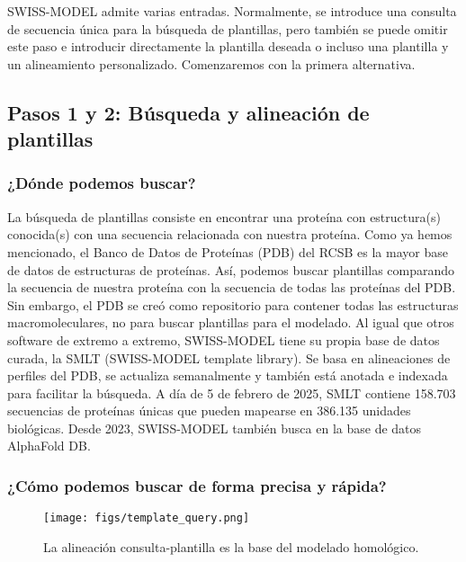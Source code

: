 SWISS-MODEL admite varias entradas. Normalmente, se introduce una consulta de secuencia única para la búsqueda de plantillas, pero también se puede omitir este paso e introducir directamente la plantilla deseada o incluso una plantilla y un alineamiento personalizado. Comenzaremos con la primera alternativa.

\subsection{Pasos 1 y 2: Búsqueda y alineación de plantillas}
\subsubsection{¿Dónde podemos buscar?}
La búsqueda de plantillas consiste en encontrar una proteína con estructura(s) conocida(s) con una secuencia relacionada con nuestra proteína. Como ya hemos mencionado, el Banco de Datos de Proteínas (PDB) del RCSB es la mayor base de datos de estructuras de proteínas. Así, podemos buscar plantillas comparando la secuencia de nuestra proteína con la secuencia de todas las proteínas del PDB. Sin embargo, el PDB se creó como repositorio para contener todas las estructuras macromoleculares, no para buscar plantillas para el modelado. Al igual que otros software de extremo a extremo, SWISS-MODEL tiene su propia base de datos curada, la SMLT (SWISS-MODEL template library). Se basa en alineaciones de perfiles del PDB, se actualiza semanalmente y también está anotada e indexada para facilitar la búsqueda. A día de 5 de febrero de 2025, SMLT contiene 158.703 secuencias de proteínas únicas que pueden mapearse en 386.135 unidades biológicas. Desde 2023, SWISS-MODEL también busca en la base de datos AlphaFold DB.

\subsubsection{¿Cómo podemos buscar de forma precisa y rápida?}
\begin{figure}[h]
\centering
\texttt{[image: figs/template\_query.png]}
\caption{La alineación consulta-plantilla es la base del modelado homológico.}
\end{figure}

